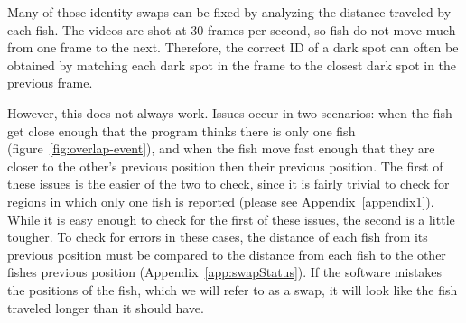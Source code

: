 \documentclass{article}
\newlength{\mylen}
\begin{document}
Many of those identity swaps can be fixed by analyzing the distance traveled by each fish. The videos are shot at 30 frames per second, so fish do not move much from one frame to the next. Therefore, the correct ID of a dark spot can often be obtained by matching each dark spot in the frame to the closest dark spot in the previous frame.


However, this does not always work. Issues occur in two scenarios: when the fish get close enough that the program thinks there is only one fish (figure~\ref{fig:overlap-event}), and when the fish move fast enough that they are closer to the other's previous position then their previous position. The first of these issues is the easier of the two to check, since it is fairly trivial to check for regions in which only one fish is reported (please see Appendix~\ref{appendix1}). While it is easy enough to check for the first of these issues, the second is a little tougher. To check for errors in these cases, the distance of each fish from its previous position must be compared to the distance from each fish to the other fishes previous position (Appendix~\ref{app:swapStatus}). If the software mistakes the positions of the fish, which we will refer to as a swap, it will look like the fish traveled longer than it should have.
\end{document}
